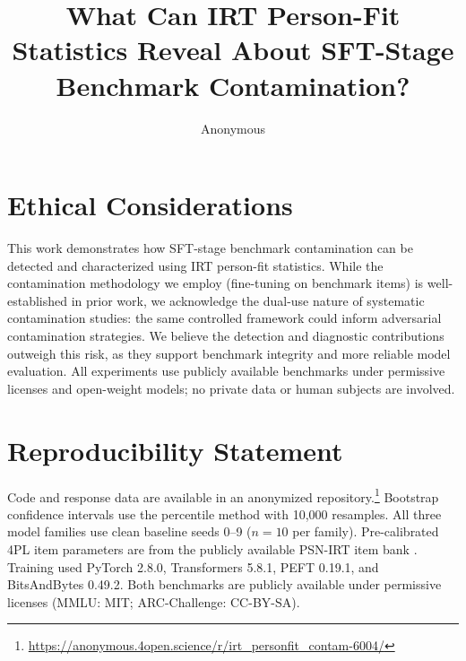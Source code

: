 \documentclass[11pt]{article}
\title{What Can IRT Person-Fit Statistics Reveal About SFT-Stage Benchmark Contamination?}
\author{Anonymous}
\begin{document}
\maketitle

\begin{abstract}

\end{abstract}










\section*{Ethical Considerations}
This work demonstrates how SFT-stage benchmark contamination can be detected and characterized using IRT person-fit statistics.
While the contamination methodology we employ (fine-tuning on benchmark items) is well-established in prior work, we acknowledge the dual-use nature of systematic contamination studies: the same controlled framework could inform adversarial contamination strategies.
We believe the detection and diagnostic contributions outweigh this risk, as they support benchmark integrity and more reliable model evaluation.
All experiments use publicly available benchmarks under permissive licenses and open-weight models; no private data or human subjects are involved.

\section*{Reproducibility Statement}
Code and response data are available in an anonymized repository.\footnote{\url{https://anonymous.4open.science/r/irt_personfit_contam-6004/}}
Bootstrap confidence intervals use the percentile method with 10,000 resamples.
All three model families use clean baseline seeds 0--9 ($n{=}10$ per family).
Pre-calibrated 4PL item parameters are from the publicly available PSN-IRT item bank \citep{psnirt2026}.
Training used PyTorch 2.8.0, Transformers 5.8.1, PEFT 0.19.1, and BitsAndBytes 0.49.2.
Both benchmarks are publicly available under permissive licenses (MMLU: MIT; ARC-Challenge: CC-BY-SA).



\appendix

\end{document}
